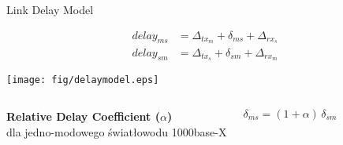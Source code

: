 \documentclass[compress,red]{beamer}
\begin{document}
% 
% 
% 
\begin{frame}{Link Delay Model}

  \begin{align}
    \nonumber delay_{ms} &= \Delta_{tx_m} + \delta_{ms} + \Delta_{rx_s} \\
    \nonumber delay_{sm} &= \Delta_{tx_s} + \delta_{sm} + \Delta_{rx_m}
  \end{align}

   \vspace{0.2cm}

  \begin{center}
  \texttt{[image: fig/delaymodel.eps]}
  \end{center}

\begin{columns}[c]
  \column{2.8in}

    \begin{center}
      \textbf{Relative Delay Coefficient ($\alpha$)} \\
      dla jedno-modowego światłowodu 1000base-X
    \end{center}

  \column{1.5in}
    \begin{center}
      \begin{equation}
      \nonumber \delta_{ms} = (1 + \alpha) \, \delta_{sm}
      \end{equation}
    \end{center}
    \vspace{0.5cm}
\end{columns}
  

\end{frame}
\end{document}
